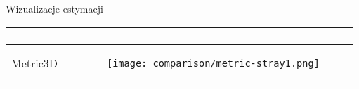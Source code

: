 \begin{easyappendix}{Wizualizacje estymacji}
\begin{table}[H]
{\begin{tabular}{ |m{3cm}|p{3cm}| }
\begin{figure}[H]
            \end{figure} \\
            \hline
            Metric3D &
            \begin{figure}[H]
                \centering
                \texttt{[image: comparison/metric-stray1.png]}
            \end{figure} \\
            \hline
            \end{tabular}%
        }
    \end{table}
    \begin{table}[H]
        \centering
        \vspace{0.1cm}
    \end{table}


\end{easyappendix}
